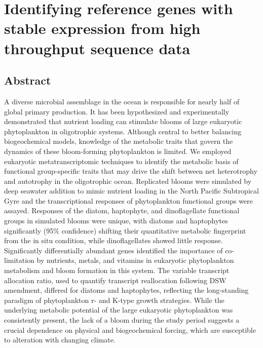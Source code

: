 

\chapter{Identifying reference genes with stable expression from high throughput sequence data}

\raggedbottom



 
\section{Abstract} 
A diverse microbial assemblage in the ocean is responsible for nearly half of global primary production. It has been hypothesized and experimentally demonstrated that nutrient loading can stimulate blooms of large eukaryotic phytoplankton in oligotrophic systems. Although central to better balancing biogeochemical models, knowledge of the metabolic traits that govern the dynamics of these bloom-forming phytoplankton is limited. We employed eukaryotic metatranscriptomic techniques to identify the metabolic basis of functional group-specific traits that may drive the shift between net heterotrophy and autotrophy in the oligotrophic ocean. Replicated blooms were simulated by deep seawater addition to mimic nutrient loading in the North Pacific Subtropical Gyre and the transcriptional responses of phytoplankton functional groups were assayed. Responses of the diatom, haptophyte, and dinoflagellate functional groups in simulated blooms were unique, with diatoms and haptophytes significantly (95\% confidence) shifting their quantitative metabolic fingerprint from the in situ condition, while dinoflagellates showed little response. Significantly differentially abundant genes identified the importance of co-limitation by nutrients, metals, and vitamins in eukaryotic phytoplankton metabolism and bloom formation in this system. The variable transcript allocation ratio, used to quantify transcript reallocation following DSW amendment, differed for diatoms and haptophytes, reflecting the long-standing paradigm of phytoplankton r- and K-type growth strategies. While the underlying metabolic potential of the large eukaryotic phytoplankton was consistently present, the lack of a bloom during the study period suggests a crucial dependence on physical and biogeochemical forcing, which are susceptible to alteration with changing climate. 
 
